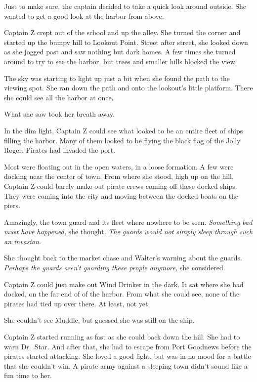 \documentclass[12pt]{extbook}
\begin{document}
  Just to make sure, the captain decided to take a quick look around
  outside. She wanted to get a good look at the harbor from above.
  
  Captain Z crept out of the school and up the alley. She turned the
  corner and started up the bumpy hill to Lookout Point. Street after
  street, she looked down as she jogged past and saw nothing but dark
  homes. A few times she turned around to try to see the harbor, but trees
  and smaller hills blocked the view.
  
  The sky was starting to light up just a bit when she found the path to
  the viewing spot. She ran down the path and onto the lookout's little
  platform. There she could see all the harbor at once.
  
  What she saw took her breath away.
  
  In the dim light, Captain Z could see what looked to be an entire fleet
  of ships filling the harbor. Many of them looked to be flying the black
  flag of the Jolly Roger. Pirates had invaded the port.
  
  Most were floating out in the open waters, in a loose formation. A few
  were docking near the center of town. From where she stood, high up on
  the hill, Captain Z could barely make out pirate crews coming off these
  docked ships. They were coming into the city and moving between the
  docked boats on the piers.
  
  Amazingly, the town guard and its fleet where nowhere to be seen.
  \emph{Something bad must have happened,} she thought. \emph{The guards
  would not simply sleep through such an invasion.}
  
  She thought back to the market chase and Walter's warning about the
  guards. \emph{Perhaps the guards aren't guarding these people anymore,}
  she considered.
  
  Captain Z could just make out Wind Drinker in the dark. It sat where she
  had docked, on the far end of of the harbor. From what she could see,
  none of the pirates had tied up over there. At least, not yet.
  
  She couldn't see Muddle, but guessed she was still on the ship.
  
  Captain Z started running as fast as she could back down the hill. She
  had to warn Dr.~Star. And after that, she had to escape from Port
  Goodnews before the pirates started attacking. She loved a good fight,
  but was in no mood for a battle that she couldn't win. A pirate army
  against a sleeping town didn't sound like a fun time to her.
  
\end{document}
